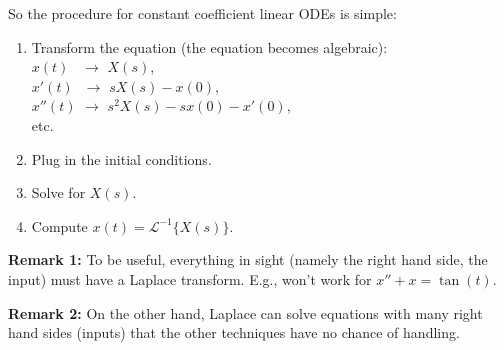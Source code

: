 \documentclass[10pt,aspectratio=169]{beamer}
\begin{document}
\begin{frame}
So the procedure for constant coefficient linear ODEs is simple:

\begin{enumerate}
\item
\pause
Transform the equation (the equation becomes algebraic):
\\
$x(t)\phantom{{}''}$ \quad $\to$ \quad $X(s)$,
\\
$x'(t)\phantom{{}'}$ \quad $\to$ \quad $sX(s)-x(0)$,
\\
$x''(t)$ \quad $\to$ \quad $s^2X(s)-s x(0) - x'(0)$,
\\
etc.
\item
\pause
Plug in the initial conditions.
\item
\pause
Solve for $X(s)$.
\item
\pause
Compute $x(t) = \mathcal{L}^{-1} \bigl\{ X(s) \bigr\}$.
\end{enumerate}

\medskip
\pause

\textbf{Remark 1:} To be useful, everything in sight
(namely the right hand side, the input) must have
a Laplace transform.  E.g., won't work for $x''+x=\tan(t)$.

\medskip
\pause

\textbf{Remark 2:} On the other hand, Laplace can solve equations
with many right hand sides (inputs) that the other techniques have no chance
of handling.
\end{frame}
\end{document}
